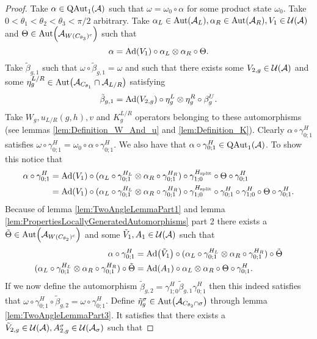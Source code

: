 \documentclass[11pt,a4paper,twoside]{article}
\numberwithin{equation}{section}
\begin{document}
\begin{proof}
	Take $\alpha\in\QAut{\AA}$ such that $\omega=\omega_0\circ\alpha$ for some product state $\omega_0$. Take $0<\theta_1<\theta_2<\theta_3<\pi/2$ arbitrary. Take $\alpha_L\in\Aut{\AA_L},\alpha_R\in\Aut{\AA_R},V_1\in\UU(\AA)$ and $\Theta\in\Aut{\AA_{W(C_{\theta_3})^c}}$ such that
	\begin{equation}
		\alpha=\Ad{V_1}\circ\alpha_L\otimes\alpha_R\circ\Theta.
	\end{equation}
	Take $\tilde{\beta}_{g,1}$ such that $\omega\circ\tilde{\beta}_{g,1}=\omega$ and such that there exists some $V_{2,g}\in\mathcal U(\mathcal A)$ and some $\eta_g^{L/R}\in\Aut{\AA_{C_{\theta_1}}\cap\AA_{L/R}}$ satisfying
	\begin{equation}
		\tilde{\beta}_{g,1}=\Ad{V_{2,g}}\circ\eta_{g}^L\otimes\eta_{g}^R\circ\beta_g^U.
	\end{equation}
	Take $W_g,u_{L/R}(g,h),v$ and $K_g^{L/R}$ operators belonging to these automorphisms (see lemmas \ref{lem:Definition_W_And_u} and \ref{lem:Definition_K}). Clearly $\alpha\circ\gamma^H_{0;1}$ satisfies $\omega\circ\gamma^{H}_{0;1}=\omega_0\circ\alpha\circ\gamma^{H}_{0;1}$. We also have that $\alpha\circ\gamma^{H}_{0;1}\in\QAut{\AA}$. To show this notice that
	\begin{align}
		\alpha\circ\gamma^{H}_{0;1}&=\Ad{V_1}\circ(\alpha_L\circ\gamma^{H_L}_{0;1}\otimes\alpha_R\circ\gamma^{H_R}_{0;1})\circ\gamma^{\Hsplit}_{1;0}\circ\Theta\circ\gamma^H_{0;1}\\
		&=\Ad{V_1}\circ(\alpha_L\circ\gamma^{H_L}_{0;1}\otimes\alpha_R\circ\gamma^{H_R}_{0;1})\circ\gamma^{\Hsplit}_{1;0}\circ\gamma^{H}_{0;1}\circ\gamma^{H}_{1;0}\circ\Theta\circ\gamma^H_{0;1}.
	\end{align}
	Because of lemma \ref{lem:TwoAngleLemmaPart1} and lemma \ref{lem:PropertiesLocallyGeneratedAutomorphisms} part 2 there exists a $\tilde{\Theta}\in\Aut{\AA_{W(C_{\theta_2})^c}}$ and some $\tilde V_1,A_1\in\mathcal U(\mathcal A)$ such that
	\begin{align}
		\alpha\circ\gamma^H_{0;1}&=\Ad{\tilde V_1}\circ(\alpha_L\circ\gamma^{H_L}_{0;1}\otimes\alpha_R\circ\gamma^{H_R}_{0;1})\circ\tilde\Theta\\
		\label{eq:ProofThatTheH2IndexIsInvariantUnderLGA's_Definition_A1}
		(\alpha_L\circ\gamma^{H_L}_{0;1}\otimes\alpha_R\circ\gamma^{H_R}_{0;1})\circ\tilde\Theta&=\Ad{A_1}\circ \alpha_L\otimes\alpha_R\circ\Theta\circ\gamma^{H}_{0;1}.
	\end{align}
	If we now define the automorphism $\tilde{\beta}_{g,2}=\gamma^{H}_{1;0}\tilde\beta_{g,1}\gamma^{H}_{0;1}$ then this indeed satisfies that $\omega\circ\gamma^{H}_{0;1}\circ\tilde{\beta}_{g,2}=\omega\circ\gamma^{H}_{0;1}$. Define $\tilde\eta_g^\sigma\in\Aut{\AA_{C_{\theta_2}\cap\sigma}}$ through lemma \ref{lem:TwoAngleLemmaPart3}. It satisfies that there exists a $\tilde V_{2,g}\in\mathcal U(\mathcal A),A_{2,g}^{\sigma}\in\mathcal U(\mathcal A_\sigma)$ such that

\end{proof}
\end{document}
